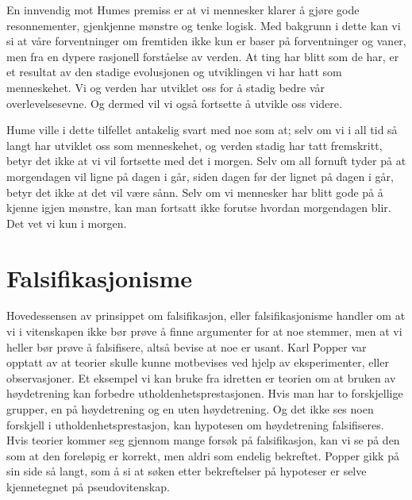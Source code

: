 \documentclass[
  letterpaper,
  DIV=11,
  numbers=noendperiod]{scrreprt}
\begin{document}
En innvendig mot Humes premiss er at vi mennesker klarer å gjøre gode
resonnementer, gjenkjenne mønstre og tenke logisk. Med bakgrunn i dette
kan vi si at våre forventninger om fremtiden ikke kun er baser på
forventninger og vaner, men fra en dypere rasjonell forståelse av
verden. At ting har blitt som de har, er et resultat av den stadige
evolusjonen og utviklingen vi har hatt som menneskehet. Vi og verden har
utviklet oss for å stadig bedre vår overlevelsesevne. Og dermed vil vi
også fortsette å utvikle oss videre.

Hume ville i dette tilfellet antakelig svart med noe som at; selv om vi
i all tid så langt har utviklet oss som menneskehet, og verden stadig
har tatt fremskritt, betyr det ikke at vi vil fortsette med det i
morgen. Selv om all fornuft tyder på at morgendagen vil ligne på dagen i
går, siden dagen før der lignet på dagen i går, betyr det ikke at det
vil være sånn. Selv om vi mennesker har blitt gode på å kjenne igjen
mønstre, kan man fortsatt ikke forutse hvordan morgendagen blir. Det vet
vi kun i morgen.

\section{Falsifikasjonisme}\label{falsifikasjonisme}

Hovedessensen av prinsippet om falsifikasjon, eller falsifikasjonisme
handler om at vi i vitenskapen ikke bør prøve å finne argumenter for at
noe stemmer, men at vi heller bør prøve å falsifisere, altså bevise at
noe er usant. Karl Popper var opptatt av at teorier skulle kunne
motbevises ved hjelp av eksperimenter, eller observasjoner. Et eksempel
vi kan bruke fra idretten er teorien om at bruken av høydetrening kan
forbedre utholdenhetsprestasjonen. Hvis man har to forskjellige grupper,
en på høydetrening og en uten høydetrening. Og det ikke ses noen
forskjell i utholdenhetsprestasjon, kan hypotesen om høydetrening
falsifiseres. Hvis teorier kommer seg gjennom mange forsøk på
falsifikasjon, kan vi se på den som at den foreløpig er korrekt, men
aldri som endelig bekreftet. Popper gikk på sin side så langt, som å si
at søken etter bekreftelser på hypoteser er selve kjennetegnet på
pseudovitenskap.
\end{document}
